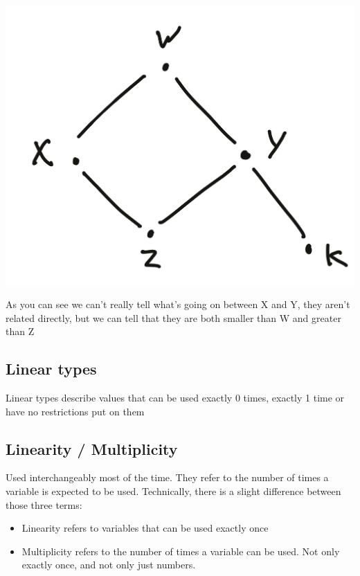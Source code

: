 \documentclass[
]{article}
\providecommand{\tightlist}{%
  \setlength{\itemsep}{0pt}\setlength{\parskip}{0pt}}
\begin{document}
\includegraphics{lattice.jpg}

As you can see we can't really tell what's going on between X and Y,
they aren't related directly, but we can tell that they are both smaller
than W and greater than Z

\hypertarget{linear-types-1}{%
\subsection{Linear types}\label{linear-types-1}}

Linear types describe values that can be used exactly 0 times, exactly 1
time or have no restrictions put on them

\hypertarget{linearity-multiplicity}{%
\subsection{Linearity / Multiplicity}\label{linearity-multiplicity}}

Used interchangeably most of the time. They refer to the number of times
a variable is expected to be used. Technically, there is a slight
difference between those three terms:

\begin{itemize}
\tightlist
\item
  Linearity refers to variables that can be used exactly once
\item
  Multiplicity refers to the number of times a variable can be used. Not
  only exactly once, and not only just numbers.
\end{itemize}
\end{document}
